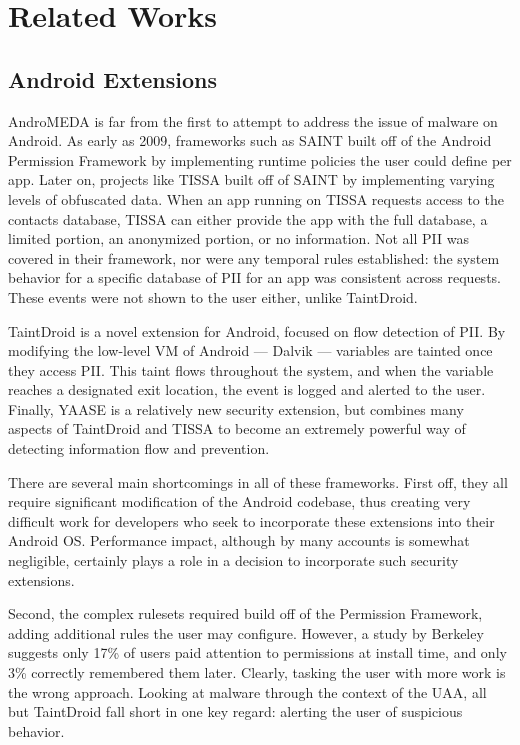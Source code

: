 \chapter{Related Works}
\label{sec:relatedworks}


\section{Android Extensions}
AndroMEDA is far from the first to attempt to address the issue of malware on Android. As early as 2009, frameworks such as SAINT\citep{ongtang2012semantically} built off of the Android Permission Framework by implementing runtime policies the user could define per app. Later on, projects like TISSA\citep{zhou2011taming} built off of SAINT by implementing varying levels of obfuscated data. When an app running on TISSA requests access to the contacts database, TISSA can either provide the app with the full database, a limited portion, an anonymized portion, or no information. Not all PII was covered in their framework, nor were any temporal rules established: the system behavior for a specific database of PII for an app was consistent across requests. These events were not shown to the user either, unlike TaintDroid\citep{enck2010taintdroid}.

TaintDroid is a novel extension for Android, focused on flow detection of PII. By modifying the low-level VM of Android --- Dalvik --- variables are tainted once they access PII. This taint flows throughout the system, and when the variable reaches a designated exit location, the event is logged and alerted to the user. Finally, YAASE\citep{russello2011yaase} is a relatively new security extension, but combines many aspects of TaintDroid and TISSA to become an extremely powerful way of detecting information flow and prevention.

There are several main shortcomings in all of these frameworks. First off, they all require significant modification of the Android codebase, thus creating very difficult work for developers who seek to incorporate these extensions into their Android OS. Performance impact, although by many accounts is somewhat negligible, certainly plays a role in a decision to incorporate such security extensions.

Second, the complex rulesets required build off of the Permission Framework, adding additional rules the user may configure. However, a study by Berkeley suggests only 17\% of users paid attention to permissions at install time, and only 3\% correctly remembered them later\citep{felt2012android}. Clearly, tasking the user with more work is the wrong approach. Looking at malware through the context of the UAA, all but TaintDroid fall short in one key regard: alerting the user of suspicious behavior.

